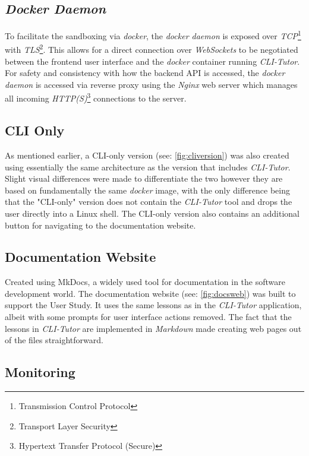 \subsection{\textit{Docker Daemon}} To facilitate the sandboxing via
\textit{docker}, the \textit{docker daemon} is exposed over
\textit{TCP}\footnote{Transmission Control Protocol} with
\textit{TLS}\footnote{Transport Layer Security}. This allows for a direct
connection over \textit{WebSockets} to be negotiated between the frontend user
interface and the \textit{docker} container running \textit{CLI-Tutor}. For
safety and consistency with how the backend API is accessed, the \textit{docker
daemon} is accessed via reverse proxy using the \textit{Nginx} web server which
manages all incoming \textit{HTTP(S)}\footnote{Hypertext Transfer Protocol
(Secure)} connections to the server. 

 
\subsection{CLI Only} As mentioned earlier, a CLI-only version (see:
\autoref{fig:cliversion}) was also created using essentially the same
architecture as the version that includes \textit{CLI-Tutor}. Slight visual
differences were made to differentiate the two however they are based on
fundamentally the same \textit{docker} image, with the only difference being
that the "CLI-only" version does not contain the \textit{CLI-Tutor} tool and
drops the user directly into a Linux shell. The CLI-only version also contains
an additional button for navigating to the documentation website.

\subsection{Documentation Website} Created using MkDocs,\cite{mkdocs} a widely
used tool for documentation in the software development world. The
documentation website (see: \autoref{fig:docsweb}) was built to support the
User Study. It uses the same lessons as in the \textit{CLI-Tutor} application,
albeit with some prompts for user interface actions removed. The fact that the
lessons in \textit{CLI-Tutor} are implemented in \textit{Markdown} made
creating web pages out of the files straightforward.

\subsection{Monitoring}

